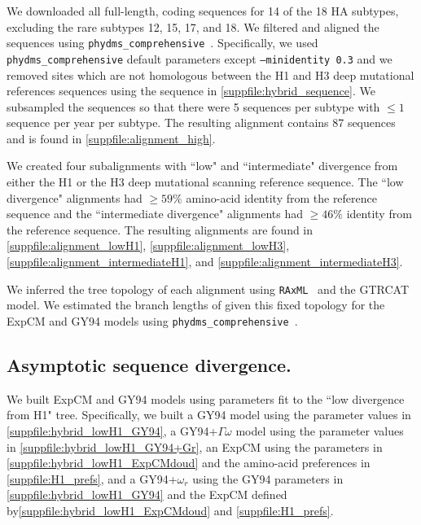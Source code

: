 \documentclass[11pt]{article}
\begin{document}
We downloaded all full-length, coding sequences for 14 of the 18 HA subtypes, excluding the rare subtypes 12, 15, 17, and 18. 
We filtered and aligned the sequences using \texttt{phydms\_comprehensive}~\citep{hilton2017phydms}. 
Specifically, we used \texttt{phydms\_comprehensive} default parameters except \texttt{--minidentity 0.3} and we removed sites which are not homologous between the H1 and H3 deep mutational references sequences using the sequence in \ref{suppfile:hybrid_sequence}. 
We subsampled the sequences so that there were 5 sequences per subtype with $\le 1$ sequence per year per subtype. 
The resulting alignment contains 87 sequences and is found in \ref{suppfile:alignment_high}. 

We created four subalignments with ``low" and ``intermediate" divergence from either the H1 or the H3 deep mutational scanning reference sequence. 
The ``low divergence" alignments had   $\ge 59\%$ amino-acid identity from the reference sequence and the ``intermediate divergence" alignments had $\ge 46\%$ identity from the reference sequence.
The resulting alignments are found in \ref{suppfile:alignment_lowH1}, \ref{suppfile:alignment_lowH3}, \ref{suppfile:alignment_intermediateH1}, and \ref{suppfile:alignment_intermediateH3}.  

We inferred the tree topology of each alignment using \texttt{RAxML}~\citep{stamatakis2006raxml} and the GTRCAT model. 
We estimated the branch lengths of given this fixed topology for the ExpCM and GY94 models using \texttt{phydms\_comprehensive}~\citep{hilton2017phydms}. 

\subsection*{Asymptotic sequence divergence.}

We built ExpCM and GY94 models using parameters fit to the ``low divergence from H1" tree.  
Specifically, we built a GY94 model using the parameter values in \ref{suppfile:hybrid_lowH1_GY94}, a GY94+$\Gamma\omega$ model using the parameter values in \ref{suppfile:hybrid_lowH1_GY94+Gr}, an ExpCM using the parameters in \ref{suppfile:hybrid_lowH1_ExpCMdoud} and the amino-acid preferences in \ref{suppfile:H1_prefs}, and a GY94+$\omega_r$ using the GY94 parameters in \ref{suppfile:hybrid_lowH1_GY94} and the ExpCM defined by\ref{suppfile:hybrid_lowH1_ExpCMdoud} and \ref{suppfile:H1_prefs}. 
\end{document}
